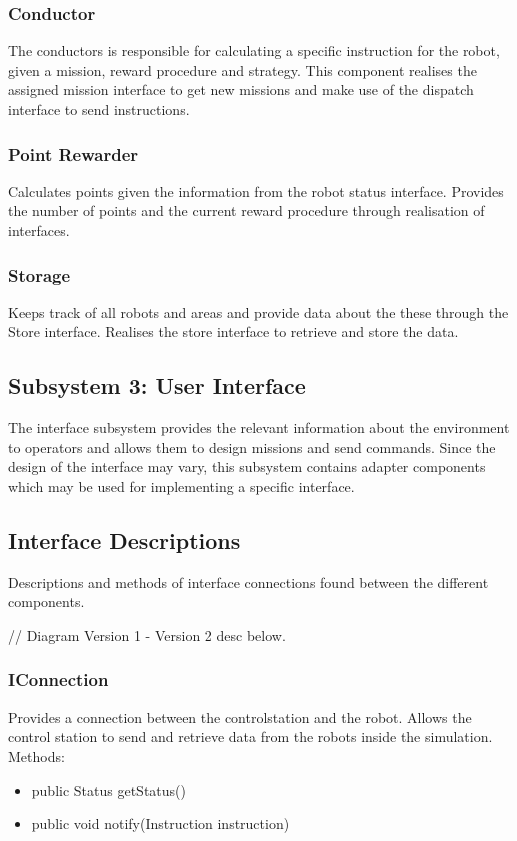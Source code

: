 \subsubsection*{Conductor}
The conductors is responsible for calculating a specific instruction for the robot, given a mission, reward procedure and strategy. This component realises the assigned mission interface to get new missions and make use of the dispatch interface to send instructions.
\subsubsection*{Point Rewarder}
Calculates points given the information from the robot status interface. Provides the number of points and the current reward procedure through realisation of interfaces.
\subsubsection*{Storage}
Keeps track of all robots and areas and provide data about the these through the Store interface. Realises the store interface to retrieve and store the data.

\subsection*{Subsystem 3: User Interface}
The interface subsystem provides the relevant information about the environment to operators and allows them to design missions and send commands. Since the design of the interface may vary, this subsystem contains adapter components which may be used for implementing a specific interface.

\subsection*{Interface Descriptions}
Descriptions and methods of interface connections found between the different components.

// Diagram Version 1 - Version 2 desc below.
\subsubsection{IConnection}
Provides a connection between the controlstation and the robot. Allows the control station to send and retrieve data from the robots inside the simulation.
Methods:
\begin{itemize}
    \item public Status getStatus()
	\item public void notify(Instruction instruction)
\end{itemize}

